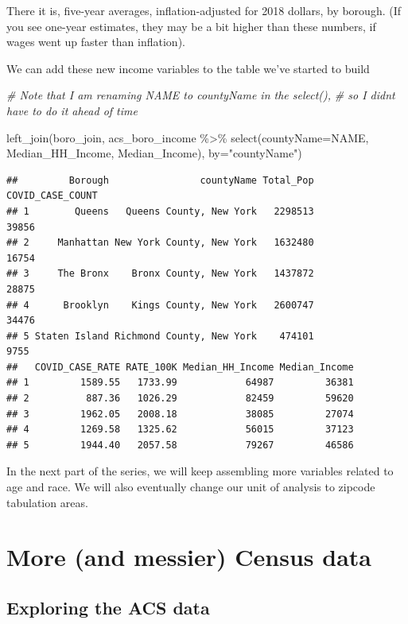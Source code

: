 \documentclass[
  openany]{book}
\newenvironment{Shaded}{\begin{snugshade}}{\end{snugshade}}
\newcommand{\AttributeTok}[1]{\textcolor[rgb]{0.77,0.63,0.00}{#1}}
\newcommand{\CommentTok}[1]{\textcolor[rgb]{0.56,0.35,0.01}{\textit{#1}}}
\newcommand{\FunctionTok}[1]{\textcolor[rgb]{0.00,0.00,0.00}{#1}}
\newcommand{\NormalTok}[1]{#1}
\newcommand{\SpecialCharTok}[1]{\textcolor[rgb]{0.00,0.00,0.00}{#1}}
\newcommand{\StringTok}[1]{\textcolor[rgb]{0.31,0.60,0.02}{#1}}
\begin{document}
There it is, five-year averages, inflation-adjusted for 2018 dollars, by borough. (If you see one-year estimates, they may be a bit higher than these numbers, if wages went up faster than inflation).

We can add these new income variables to the table we've started to build

\begin{Shaded}
\begin{Highlighting}[]
\CommentTok{\# Note that I am renaming NAME to countyName in the select(), }
\CommentTok{\# so I didn\textquotesingle{}t have to do it ahead of time}

\FunctionTok{left\_join}\NormalTok{(boro\_join, }
\NormalTok{          acs\_boro\_income }\SpecialCharTok{\%\textgreater{}\%} \FunctionTok{select}\NormalTok{(}\AttributeTok{countyName=}\NormalTok{NAME, Median\_HH\_Income, Median\_Income), }
          \AttributeTok{by=}\StringTok{"countyName"}\NormalTok{)}
\end{Highlighting}
\end{Shaded}

\begin{verbatim}
##         Borough                countyName Total_Pop COVID_CASE_COUNT
## 1        Queens   Queens County, New York   2298513            39856
## 2     Manhattan New York County, New York   1632480            16754
## 3     The Bronx    Bronx County, New York   1437872            28875
## 4      Brooklyn    Kings County, New York   2600747            34476
## 5 Staten Island Richmond County, New York    474101             9755
##   COVID_CASE_RATE RATE_100K Median_HH_Income Median_Income
## 1         1589.55   1733.99            64987         36381
## 2          887.36   1026.29            82459         59620
## 3         1962.05   2008.18            38085         27074
## 4         1269.58   1325.62            56015         37123
## 5         1944.40   2057.58            79267         46586
\end{verbatim}

In the next part of the series, we will keep assembling more variables related to age and race. We will also eventually change our unit of analysis to zipcode tabulation areas.

\hypertarget{part3}{%
\section{More (and messier) Census data}\label{part3}}

\hypertarget{exploring-the-acs-data}{%
\subsection*{Exploring the ACS data}\label{exploring-the-acs-data}}
\end{document}
